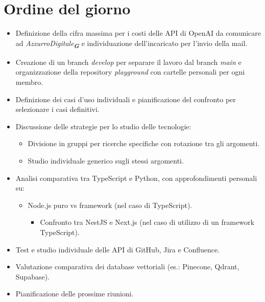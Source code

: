 

\section{Ordine del giorno}

\begin{itemize}
    \item Definizione della cifra massima per i costi delle API di OpenAI da comunicare ad \emph{AzzurroDigitale}\textsubscript{\textit{\textbf{G}}} e individuazione dell'incaricato per l'invio della mail.
    \item Creazione di un branch \emph{develop} per separare il lavoro dal branch \emph{main} e organizzazione della repository \emph{playground} con cartelle personali per ogni membro.
    \item Definizione dei casi d'uso individuali e pianificazione del confronto per selezionare i casi definitivi.
    \item Discussione delle strategie per lo studio delle tecnologie:
    \begin{itemize}
        \item Divisione in gruppi per ricerche specifiche con rotazione tra gli argomenti.
        \item Studio individuale generico sugli stessi argomenti.
    \end{itemize}
    \item Analisi comparativa tra TypeScript e Python, con approfondimenti personali su:
    \begin{itemize}
        \item Node.js puro vs framework (nel caso di TypeScript).
        \begin{itemize}
            \item Confronto tra NestJS e Next.js (nel caso di utilizzo di un framework TypeScript).
        \end{itemize}
    \end{itemize}
    \item Test e studio individuale delle API di GitHub, Jira e Confluence.
    \item Valutazione comparativa dei database vettoriali (es.: Pinecone, Qdrant, Supabase).
    \item Pianificazione delle prossime riunioni.
\end{itemize}